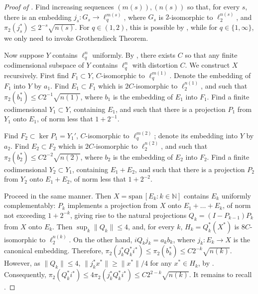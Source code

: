 \documentclass{amsart}
\theoremstyle{plain}
\theoremstyle{definition}
\numberwithin{equation}{section}
\newcommand{\N}{\mathbb{N}}
\newcommand{\spn}{\textrm{span}\,}
\begin{document}
\begin{proof}[Proof of ]
Find increasing sequences $(m(s)), (n(s))$ so that, for every $s$, there is an embedding $j_s : G_s \to \ell_q^{m(s)}$, where $G_s$ is $2$-isomorphic to $\ell_2^{n(s)}$, and $\pi_2(j_s^*) \leq 2^{-s} \sqrt{n(s)}$.
For $q \in (1,2)$, this is possible by , while for $q \in \{1,\infty\}$, we only need to invoke Grothendieck Theorem.

Now suppose $Y$ contains $\ell_q^n$ uniformly. By , there exists $C$ so that any finite codimensional subspace of $Y$ contains $\ell_q^n$ with distortion $C$. 
We construct $X$ recursively. First find $F_1 \subset Y$, $C$-isomorphic to $\ell_q^{m(1)}$. Denote the embedding of $F_1$ into $Y$ by $a_1$. 
Find $E_1 \subset F_1$ which is $2C$-isomorphic to $\ell_2^{n(1)}$, and such that $\pi_2(b_1^*) \leq C 2^{-1} \sqrt{n(1)}$, where $b_1$ is the embedding of $E_1$ into $F_1$.
Find a finite codimensional $Y_1 \subset Y$, containing $E_1$, and such that there is a projection $P_1$ from $Y_1$ onto $E_1$, of norm less that $1 + 2^{-1}$.

Find $F_2 \subset \ker P_1 = Y_1'$, $C$-isomorphic to $\ell_q^{m(2)}$; denote its embedding into $Y$ by $a_2$.
Find $E_2 \subset F_2$ which is $2C$-isomorphic to $\ell_2^{n(2)}$, and such that $\pi_2(b_2^*) \leq C 2^{-2} \sqrt{n(2)}$, where $b_2$ is the embedding of $E_2$ into $F_2$.
Find a finite codimensional $Y_2 \subset Y_1$, containing $E_1 + E_2$, and such that there is a projection $P_2$ from $Y_2$ onto $E_1 + E_2$, of norm less that $1 + 2^{-2}$.

Proceed in the same manner. Then $X = \spn[E_k : k \in \N]$ contains $E_k$ uniformly complementably: $P_k$ implements a projection from $X$ onto $E_1 + \ldots + E_k$, of norm not exceeding $1 + 2^{-k}$, giving rise to the natural projections $Q_k = (I - P_{k-1}) P_k$ from $X$ onto $E_k$. 
Then $\sup_k \|Q_k\| \leq 4$, and, for every $k$, $H_k = Q_k^*(X^*)$ is $8C$-isomorphic to $\ell_2^{n(k)}$.
On the other hand, $iQ_k j_k = a_kb_k$, where $j_k : E_k \to X$ is the canonical embedding. Therefore, $\pi_2(j_k^* Q_k^* i^*) \leq \pi_2(b_k^*) \leq C 2^{-k} \sqrt{n(k)}$.
However, as $\|Q_k\| \leq 4$, $\|j_k^* x^*\| \geq \|x^*\|/4$ for any $x^* \in H_k$, by . Consequently, $\pi_2(Q_k^* i^*) \leq 4 \pi_2(j_k^* Q_k^* i^*) \leq C 2^{2-k} \sqrt{n(k)}$. It remains to recall .
\end{proof}
\end{document}
